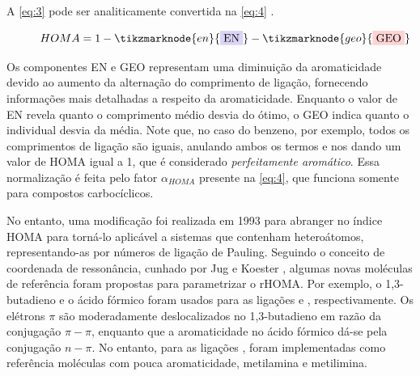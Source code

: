 \newpage
A \autoref{eq:3} pode ser analiticamente convertida na \autoref{eq:4} \autocite{MarekKrygowski1998}. 

\begin{figure}[htb]
    \vspace{2\baselineskip}
\begin{equation}
    \label{eq:4}
    HOMA = 1 - \tikzmarknode{en}{\highlight{blue}{EN}} - \tikzmarknode{geo}{\highlight{red}{GEO}}
\end{equation}
\vspace{2\baselineskip}
\end{figure}

Os componentes EN e GEO representam uma diminuição da aromaticidade devido ao aumento da alternação do comprimento de ligação, fornecendo informações mais detalhadas a respeito da aromaticidade. Enquanto o valor de EN revela quanto o comprimento médio desvia do ótimo, o GEO indica quanto o individual desvia da média. Note que, no caso do benzeno, por exemplo, todos os comprimentos de ligação são iguais, anulando ambos os termos e nos dando um valor de \gls{HOMA} igual a 1, que é considerado \textit{perfeitamente aromático}. Essa normalização é feita pelo fator $\alpha_{HOMA}$ presente na \autoref{eq:4}, que funciona somente para compostos carbocíclicos.

No entanto, uma modificação foi realizada em 1993 para abranger no índice HOMA para torná-lo aplicável a sistemas que contenham heteroátomos, representando-as por números de ligação de Pauling. Seguindo o conceito de coordenada de ressonância, cunhado por Jug e Koester \autocite{Jug1990}, algumas novas moléculas de referência foram propostas para parametrizar o \gls{rHOMA}. Por exemplo, o 1,3-butadieno e o ácido fórmico foram usados para as ligações  e , respectivamente. Os elétrons $\pi$ são moderadamente deslocalizados no 1,3-butadieno em razão da conjugação $\pi-\pi$, enquanto que a aromaticidade no ácido fórmico dá-se pela conjugação $n-\pi$. No entanto, para as ligações , foram implementadas como referência moléculas com pouca aromaticidade, metilamina e metilimina. 

